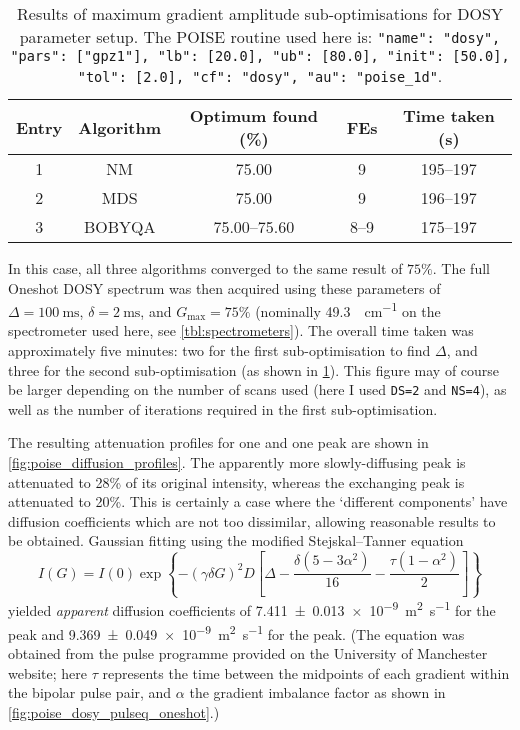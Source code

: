 \begin{table}[htb]
    \centering
    \begin{tabular}{ccccc}
        \toprule
        Entry & Algorithm & Optimum found (\%) & FEs  & Time taken (\unit{\s}) \\
        \midrule
        1     & NM        & 75.00              & 9    & 195--197             \\
        2     & MDS       & 75.00              & 9    & 196--197             \\
        3     & BOBYQA    & 75.00--75.60       & 8--9 & 175--197             \\
        \bottomrule
    \end{tabular}
    \caption[DOSY maximum gradient amplitude sub-optimisations]{
        Results of maximum gradient amplitude sub-optimisations for DOSY parameter setup.
        The POISE routine used here is: \texttt{{"name": "dosy", "pars": ["gpz1"], "lb": [20.0], "ub": [80.0], "init": [50.0], "tol": [2.0], "cf": "dosy", "au": "poise_1d"}}.
    }
    \label{tbl:poise_dosy_opt2}
\end{table}

In this case, all three algorithms converged to the same result of $75\%$.
The full Oneshot DOSY spectrum was then acquired using these parameters of $\Delta = \qty{100}{\ms}$, $\delta = \qty{2}{\ms}$, and $G_\text{max} = 75\%$ (nominally \qty{49.3}{\gauss\per\cm} on the spectrometer used here, see \cref{tbl:spectrometers}).
The overall time taken was approximately five minutes: two for the first sub-optimisation to find $\Delta$, and three for the second sub-optimisation (as shown in \cref{tbl:poise_dosy_opt2}).
This figure may of course be larger depending on the number of scans used (here I used \texttt{DS=2} and \texttt{NS=4}), as well as the number of iterations required in the first sub-optimisation.

The resulting attenuation profiles for one  and one  peak are shown in \cref{fig:poise_diffusion_profiles}.
The apparently more slowly-diffusing  peak is attenuated to 28\% of its original intensity, whereas the exchanging  peak is attenuated to 20\%.
This is certainly a case where the `different components' have diffusion coefficients which are not too dissimilar, allowing reasonable results to be obtained.
Gaussian fitting using the modified Stejskal--Tanner equation
\begin{equation}
    \label{eq:stejskal_tanner_oneshot}
    I(G) = I(0) \exp\left\{-(\gamma\delta G)^2 D \left[\Delta - \frac{\delta(5 - 3\alpha^2)}{16} - \frac{\tau(1-\alpha^2)}{2}\right]\right\}
\end{equation}
yielded \textit{apparent} diffusion coefficients of \qty{7.411(13)e-9}{\m\squared\per\s} for the  peak and \qty{9.369(49)e-9}{\m\squared\per\s} for the  peak.
(The equation was obtained from the pulse programme provided on the University of Manchester website; here $\tau$ represents the time between the midpoints of each gradient within the bipolar pulse pair, and $\alpha$ the gradient imbalance factor as shown in \cref{fig:poise_dosy_pulseq_oneshot}.)

